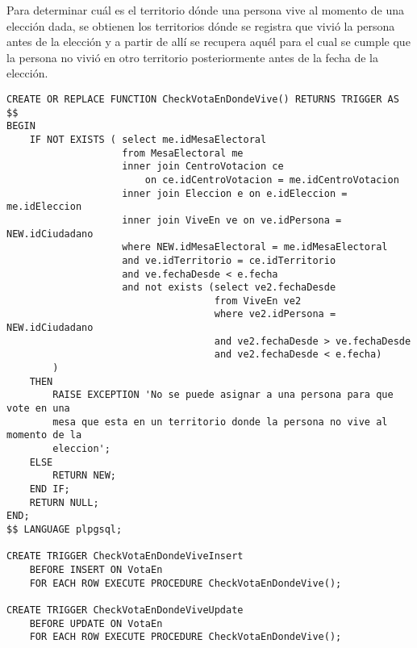 \indent Para determinar cuál es el territorio dónde una persona vive al momento de una elección dada, se obtienen los territorios dónde se registra que vivió la persona antes de la elección y a partir de allí se recupera aquél para el cual se cumple que la persona no vivió en otro territorio posteriormente antes de la fecha de la elección.\\
 

\begin{verbatim}
CREATE OR REPLACE FUNCTION CheckVotaEnDondeVive() RETURNS TRIGGER AS $$
BEGIN
    IF NOT EXISTS ( select me.idMesaElectoral
                    from MesaElectoral me
                    inner join CentroVotacion ce 
                        on ce.idCentroVotacion = me.idCentroVotacion
                    inner join Eleccion e on e.idEleccion = me.idEleccion
                    inner join ViveEn ve on ve.idPersona = NEW.idCiudadano
                    where NEW.idMesaElectoral = me.idMesaElectoral
                    and ve.idTerritorio = ce.idTerritorio
                    and ve.fechaDesde < e.fecha
                    and not exists (select ve2.fechaDesde
                                    from ViveEn ve2
                                    where ve2.idPersona = NEW.idCiudadano
                                    and ve2.fechaDesde > ve.fechaDesde 
                                    and ve2.fechaDesde < e.fecha)
        )
    THEN
        RAISE EXCEPTION 'No se puede asignar a una persona para que vote en una 
        mesa que esta en un territorio donde la persona no vive al momento de la 
        eleccion';
    ELSE
        RETURN NEW;
    END IF;
    RETURN NULL;
END;
$$ LANGUAGE plpgsql;

CREATE TRIGGER CheckVotaEnDondeViveInsert
    BEFORE INSERT ON VotaEn
    FOR EACH ROW EXECUTE PROCEDURE CheckVotaEnDondeVive();
    
CREATE TRIGGER CheckVotaEnDondeViveUpdate
    BEFORE UPDATE ON VotaEn
    FOR EACH ROW EXECUTE PROCEDURE CheckVotaEnDondeVive();

\end{verbatim}


